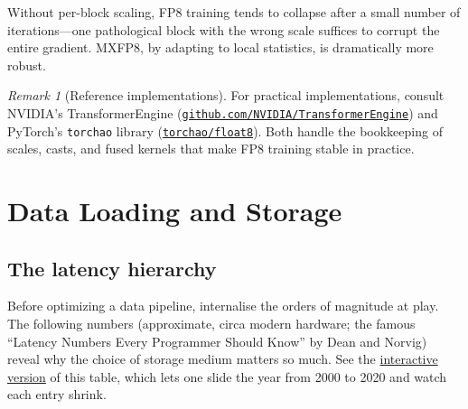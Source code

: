 \documentclass[11pt,a4paper]{article}
\theoremstyle{definition}
\theoremstyle{remark}
\newtheorem*{remark}{Remark}
\theoremstyle{plain}
\begin{document}
Without per-block scaling, FP8 training tends to collapse after a small
number of iterations---one pathological block with the wrong scale
suffices to corrupt the entire gradient. MXFP8, by adapting to local
statistics, is dramatically more robust.

\begin{remark}[Reference implementations]
For practical implementations, consult NVIDIA's TransformerEngine
(\href{https://github.com/NVIDIA/TransformerEngine}{\texttt{github.com/NVIDIA/TransformerEngine}})
and PyTorch's \texttt{torchao} library
(\href{https://github.com/pytorch/ao/tree/main/torchao/float8}{\texttt{torchao/float8}}).
Both handle the bookkeeping of scales, casts, and fused kernels that make
FP8 training stable in practice.
\end{remark}

\section{Data Loading and Storage}

\subsection{The latency hierarchy}

Before optimizing a data pipeline, internalise the orders of magnitude at
play. The following numbers (approximate, circa modern hardware; the
famous ``Latency Numbers Every Programmer Should Know'' by Dean and
Norvig) reveal why the choice of storage medium matters so much. See the
\href{https://colin-scott.github.io/personal_website/research/interactive_latency.html}{interactive
version} of this table, which lets one slide the year from 2000 to 2020
and watch each entry shrink.
\end{document}
